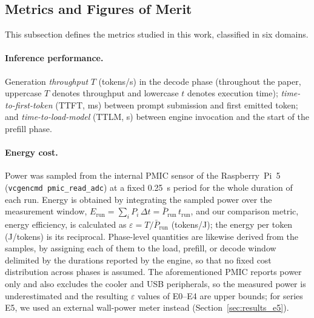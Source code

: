\documentclass[acmsmall,natbib=false]{acmart}
\begin{document}
\subsection{Metrics and Figures of Merit}\label{sec:metrics}

This subsection defines the metrics studied in this work, classified in six domains.

\paragraph{Inference performance.}
Generation \emph{throughput} $T$ (tokens/s) in the decode phase (throughout the
paper, uppercase $T$ denotes throughput and lowercase $t$ denotes execution
time);
\emph{time-to-first-token} (TTFT, ms) between prompt submission and first
emitted token; and \emph{time-to-load-model} (TTLM, s) between engine
invocation and the start of the prefill phase.

\paragraph{Energy cost.}
Power was sampled from the internal PMIC sensor of the Raspberry~Pi~5
(\texttt{vcgencmd pmic\_read\_adc}) at a fixed 0.25~s period for the whole
duration of each run. Energy is obtained by integrating the sampled power over
the measurement window, $E_{\mathrm{run}}=\sum_i P_i\,\Delta t =
\bar{P}_{\mathrm{run}}\,t_{\mathrm{run}}$, and our comparison metric, energy efficiency, is calculated as $\varepsilon = T/\bar{P}_{\mathrm{run}}$ (tokens/J); the energy per token (J/tokens) is its
reciprocal. Phase-level quantities are likewise derived from
the samples, by assigning each of them to the load, prefill, or decode window
delimited by the durations reported by the engine, so that no fixed cost
distribution across phases is assumed. The aforementioned PMIC reports power only and also excludes the cooler and USB peripherals, so the measured power is underestimated and the resulting $\varepsilon$ values of E0--E4 are upper
bounds; for series E5, we used an external wall-power meter instead
(Section~\ref{sec:results_e5}).
\end{document}
